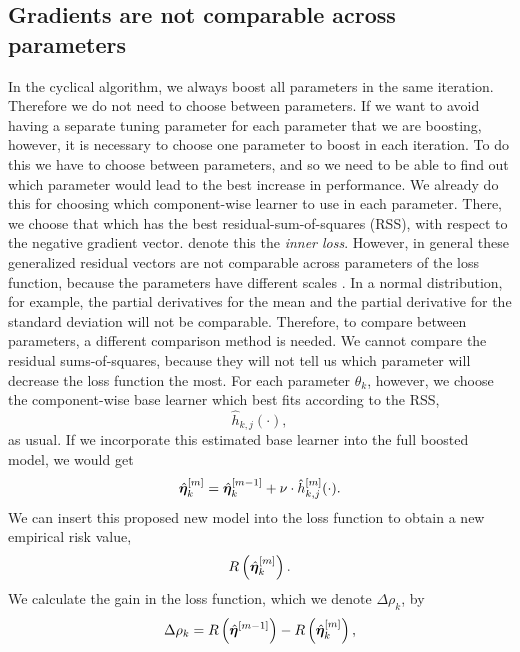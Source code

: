 \subsection{Gradients are not comparable across parameters}
In the cyclical algorithm, we always boost all parameters in the same iteration.
Therefore we do not need to choose between parameters.
If we want to avoid having a separate tuning parameter for each parameter that we are boosting, however, it is necessary to choose one parameter to boost in each iteration.
To do this we have to choose between parameters, and so we need to be able to find out which parameter would lead to the best increase in performance.
We already do this for choosing which component-wise learner to use in each parameter.
There, we choose that which has the best residual-sum-of-squares (RSS), with respect to the negative gradient vector.
\citet{thomas2018} denote this the \textit{inner loss}.
However, in general these generalized residual vectors are not comparable across parameters of the loss function, because the parameters have different scales \citep{thomas2018}.
In a normal distribution, for example, the partial derivatives for the mean and the partial derivative for the standard deviation will not be comparable.
Therefore, to compare between parameters, a different comparison method is needed.
We cannot compare the residual sums-of-squares, because they will not tell us which parameter will decrease the loss function the most.
For each parameter $\theta_k$, however, we choose the component-wise base learner which best fits according to the RSS,
\begin{equation*}
    \hat{h}_{k,j}(\cdot),
\end{equation*}
as usual.
If we incorporate this estimated base learner into the full boosted model, we would get
\begin{equation*}
    \hat{\boldsymbol{\eta}}^{[m]}_{k}=\hat{\boldsymbol{\eta}}_k^{[m-1]}+\nu\cdot\hat{h}^{[m]}_{k,j}(\cdot).
\end{equation*}
We can insert this proposed new model into the loss function to obtain a new empirical risk value,
\begin{equation*}
    R\left(\hat{\boldsymbol{\eta}}_{k}^{[m]}\right).
\end{equation*}
We calculate the gain in the loss function, which we denote $\Delta\rho_{k}$, by
\begin{equation*}
    \Delta\rho_{k}=R\left(\hat{\boldsymbol{\eta}}^{[m-1]}\right)-R\left(\hat{\boldsymbol{\eta}}_{k}^{[m]}\right),
\end{equation*}
